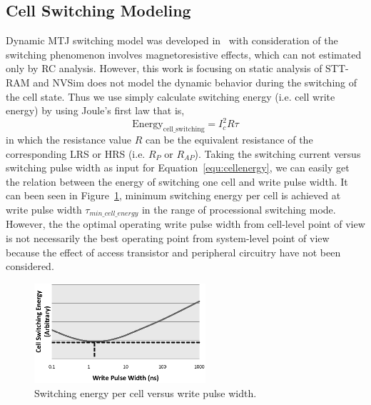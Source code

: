 \subsection{Cell Switching Modeling} \label{subsec:co-opt}
Dynamic MTJ switching model was developed in~\cite{STTRAM:Purdue10} with consideration of the switching phenomenon involves magnetoresistive effects, which can not estimated only by RC analysis.  However, this work is focusing on static analysis of STT-RAM and NVSim does not model the dynamic behavior during the switching of the cell state. Thus we use simply calculate switching energy (i.e. cell write energy) by using Joule's first law that is,
\begin{equation}
\mathrm{Energy}_{\mathrm{cell\_switching}} = I_{c}^2 R \tau \label{equ:cellenergy}
\end{equation}
in which the resistance value $R$ can be the equivalent resistance of the corresponding LRS or HRS (i.e. $R_{P}$ or $R_{AP}$). Taking the switching current versus switching pulse width as input for Equation~\ref{equ:cellenergy}, we can easily get the relation between the energy of switching one cell and write pulse width. It can been seen in Figure~\ref{fig:cellenergy}, minimum switching energy per cell is achieved at write pulse width $\tau_{min\_cell\_energy}$ in the range of processional switching mode. However, the the optimal operating write pulse width from cell-level point of view is not necessarily the best operating point from system-level point of view because the effect of access transistor and peripheral circuitry have not been considered.
\begin{figure}[t]
  \centering
  \includegraphics[width=2.5in]{fig/cellenergy.eps}
  \vspace{-10pt}
  \caption{Switching energy per cell versus write pulse width.}
  \label{fig:cellenergy}
\end{figure}

